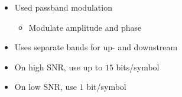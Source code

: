 \begin{itemize}
\begin{itemize}
\begin{itemize}
                \end{itemize}
        \end{itemize}
        \begin{itemize}
            \item Used passband modulation
                \begin{itemize}
                    \item Modulate amplitude and phase
                \end{itemize}
            \item Uses separate bands for up- and downstream
            \item On high SNR, use up to $15$ bits/symbol
            \item On low SNR, use $1$ bit/symbol
        \end{itemize}
\end{itemize}

